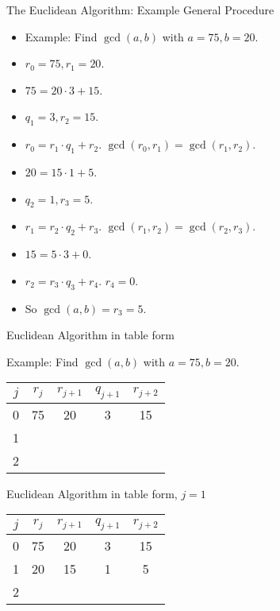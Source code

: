 \documentclass[handout]{beamer}
\begin{document}
\begin{frame}{The Euclidean Algorithm: Example General Procedure}

\begin{itemize}
  \item Example: Find $\gcd(a, b)$ with $a=75, b=20$.
  \item $r_0 = 75, r_1 = 20$.
  \item $75 = 20\cdot 3 + 15$.
  \item $q_1 = 3, r_2 = 15$.
  \item $r_0 = r_1 \cdot q_1 + r_2$. $\gcd(r_0, r_1) = \gcd(r_1, r_2)$.
  \item $20 = 15 \cdot 1 + 5$.
  \item $q_2 = 1, r_3 = 5$.
  \item $r_1 = r_2 \cdot q_2 + r_3$. $\gcd(r_1, r_2) = \gcd(r_2, r_3)$.
  \item $15 = 5 \cdot 3 + 0$.
  \item $r_2 = r_3 \cdot q_3 + r_4$. $r_4 = 0$.
  \item So $\gcd(a,b) = r_3 = 5$.
\end{itemize}

\end{frame}


\begin{frame}{Euclidean Algorithm in table form}

Example: Find $\gcd(a, b)$ with $a=75, b=20$.

\begin{tabular}{|c|c|c|c|c|}\hline
$j$   &  $r_{j}$    & $r_{j+1}$ & $q_{j+1}$ & $r_{j+2}$ \\ \hline\hline
0     &  75         &  20       &    3      &   15      \\ \hline
1     &             &           &           &           \\ \hline
2     &             &           &           &           \\ \hline
\end{tabular}

\end{frame}

\begin{frame}{Euclidean Algorithm in table form, $j=1$}

\begin{tabular}{|c|c|c|c|c|}\hline
$j$   &  $r_{j}$    & $r_{j+1}$ & $q_{j+1}$ & $r_{j+2}$ \\ \hline\hline
0     &  75         &  20       &    3      &   15      \\ \hline
1     &  20         &  15       &    1      &   5       \\ \hline
2     &             &           &           &           \\ \hline
\end{tabular}

\end{frame}
\end{document}
